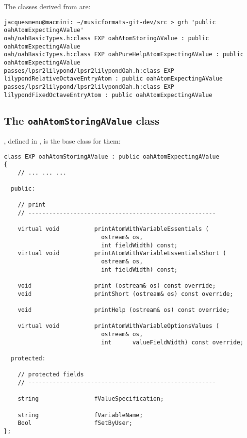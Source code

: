 The classes derived from  are:
\begin{lstlisting}[language=Terminal]
jacquesmenu@macmini: ~/musicformats-git-dev/src > grh 'public oahAtomExpectingAValue'
oah/oahBasicTypes.h:class EXP oahAtomStoringAValue : public oahAtomExpectingAValue
oah/oahBasicTypes.h:class EXP oahPureHelpAtomExpectingAValue : public oahAtomExpectingAValue
passes/lpsr2lilypond/lpsr2lilypondOah.h:class EXP lilypondRelativeOctaveEntryAtom : public oahAtomExpectingAValue
passes/lpsr2lilypond/lpsr2lilypondOah.h:class EXP lilypondFixedOctaveEntryAtom : public oahAtomExpectingAValue
\end{lstlisting}


\subsection{The {\tt oahAtomStoringAValue} class}

, defined in , is the base class for them:
\begin{lstlisting}[language=CPlusPlus]
class EXP oahAtomStoringAValue : public oahAtomExpectingAValue
{
	// ... ... ...

  public:

    // print
    // ------------------------------------------------------

    virtual void          printAtomWithVariableEssentials (
                            ostream& os,
                            int fieldWidth) const;
    virtual void          printAtomWithVariableEssentialsShort (
                            ostream& os,
                            int fieldWidth) const;

    void                  print (ostream& os) const override;
    void                  printShort (ostream& os) const override;

    void                  printHelp (ostream& os) const override;

    virtual void          printAtomWithVariableOptionsValues (
                            ostream& os,
                            int      valueFieldWidth) const override;

  protected:

    // protected fields
    // ------------------------------------------------------

    string                fValueSpecification;

    string                fVariableName;
    Bool                  fSetByUser;
};
\end{lstlisting}

